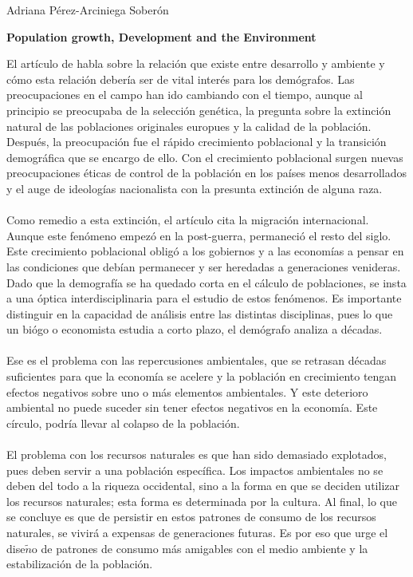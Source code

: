 \documentclass[11pt,spanish,letterpaper]{article}
\theoremstyle{plain}
\begin{document}
\begin{flushleft}
Adriana P\'erez-Arciniega Sober\'on
\end{flushleft}
\begin{center}
\textbf{Population growth, Development and the Environment}
\end{center}
El art\'iculo de \cite{keyfitz1996population} habla sobre la relaci\'on que existe entre desarrollo y ambiente y c\'omo esta relaci\'on deber\'ia ser de vital inter\'es para los dem\'ografos. Las preocupaciones en el campo han ido cambiando con el tiempo, aunque al principio se preocupaba de la selecci\'on gen\'etica, la pregunta sobre la extinci\'on natural de las poblaciones originales europues y la calidad de la poblaci\'on. Despu\'es, la preocupaci\'on fue el r\'apido crecimiento poblacional y la transici\'on demogr\'afica que se encargo de ello. Con el crecimiento poblacional surgen nuevas preocupaciones \'eticas de control de la poblaci\'on en los pa\'ises menos desarrollados y el auge de ideolog\'ias nacionalista con la presunta extinci\'on de alguna raza.\\
\\
Como remedio a esta extinci\'on, el art\'iculo cita la migraci\'on internacional. Aunque este fen\'omeno empez\'o en la post-guerra, permaneci\'o el resto del siglo. Este crecimiento poblacional oblig\'o a los gobiernos y a las econom\'ias a pensar en las condiciones que deb\'ian permanecer y ser heredadas a generaciones venideras. Dado que la demograf\'ia se ha quedado corta en el c\'alculo de poblaciones, se insta a una \'optica interdisciplinaria para el estudio de estos fen\'omenos. Es importante distinguir en la capacidad de an\'alisis entre las distintas disciplinas, pues lo que un bi\'ogo o economista estudia a corto plazo, el dem\'ografo analiza a d\'ecadas.\\
\\
Ese es el problema con las repercusiones ambientales, que se retrasan d\'ecadas suficientes para que la econom\'ia se acelere y la poblaci\'on en crecimiento tengan efectos negativos sobre uno o m\'as elementos ambientales. Y este deterioro ambiental no puede suceder sin tener efectos negativos en la econom\'ia. Este c\'irculo, podr\'ia llevar al colapso de la poblaci\'on.\\
\\
El problema con los recursos naturales es que han sido demasiado explotados, pues deben servir a una poblaci\'on espec\'ifica. Los impactos ambientales no se deben del todo a la riqueza occidental, sino a la forma en que se deciden utilizar los recursos naturales; esta forma es determinada por la cultura. Al final, lo que se concluye es que de persistir en estos patrones de consumo de los recursos naturales, se vivir\'a a expensas de generaciones futuras. Es por eso que urge el dise$\tilde{n}$o de patrones de consumo m\'as amigables con el medio ambiente y la estabilizaci\'on de la poblaci\'on. 


\end{document}
